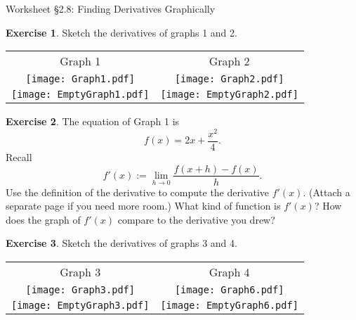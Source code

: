 \documentclass[11pt,fleqn]{article}
\theoremstyle{definition}
\newtheorem{exercise}{Exercise}
\begin{document}
\renewcommand{\headrulewidth}{0pt}



\begin{Large} 
\begin{center}{\sc
Worksheet \S2.8: Finding Derivatives Graphically }\end{center} \end{Large}



\bigskip
\begin{exercise} Sketch the derivatives of graphs 1 and 2.\end{exercise}
\begin{tabular}{c  c}
Graph 1 & Graph 2 \\
\texttt{[image: Graph1.pdf]} &\texttt{[image: Graph2.pdf]}\\
\texttt{[image: EmptyGraph1.pdf]} &\texttt{[image: EmptyGraph2.pdf]}
\end{tabular}
\vfill

\newpage

\begin{exercise}
The equation of Graph 1 is 
\[f(x) = 2 x + \frac{x^2}{4}.\]
Recall \[f'(x) := \lim_{h \to 0} \frac{f(x+h) - f(x)}{h}.\]
Use the definition of the derivative to compute the derivative $f'(x)$. (Attach a separate page if you need more room.) What kind of function is $f'(x)$? How does the graph of $f'(x)$ compare to the derivative you drew?
\end{exercise}

\vfill

\begin{exercise} Sketch the derivatives of graphs 3 and 4.\end{exercise}

\begin{tabular}{c  c}
Graph 3 & Graph 4 \\
\texttt{[image: Graph3.pdf]} &\texttt{[image: Graph6.pdf]}\\
\texttt{[image: EmptyGraph3.pdf]} &\texttt{[image: EmptyGraph6.pdf]}
\end{tabular}
\end{document}
